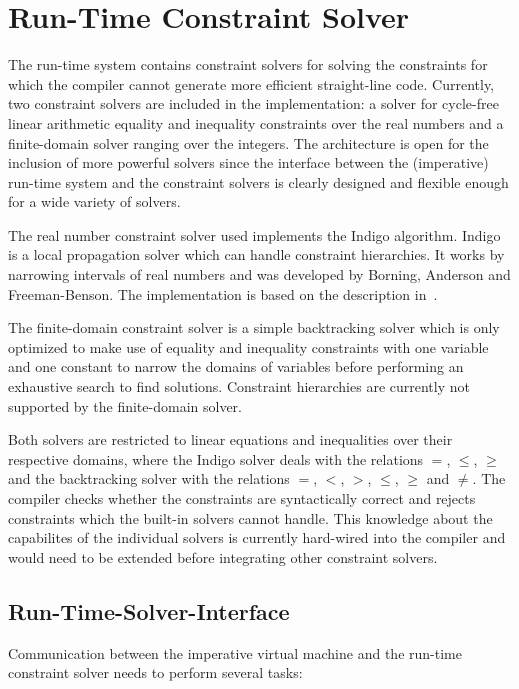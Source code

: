 \section{Run-Time Constraint Solver}

The \turtle{} run-time system contains constraint solvers for solving
the constraints for which the compiler cannot generate more efficient
straight-line code.  Currently, two constraint solvers are included in
the implementation: a solver for cycle-free linear arithmetic equality
and inequality constraints over the real numbers and a finite-domain
solver ranging over the integers.  The architecture is open for the
inclusion of more powerful solvers since the interface between the
(imperative) run-time system and the constraint solvers is clearly
designed and flexible enough for a wide variety of solvers.

The real number constraint solver used implements the Indigo
algorithm.  Indigo is a local propagation solver which can handle
constraint hierarchies.  It works by narrowing intervals of real
numbers and was developed by Borning, Anderson and Freeman-Benson.
The implementation is based on the description
in~\cite{borning96indigo}.

The finite-domain constraint solver is a simple backtracking solver
which is only optimized to make use of equality and inequality
constraints with one variable and one constant to narrow the domains
of variables before performing an exhaustive search to find solutions.
Constraint hierarchies are currently not supported by the
finite-domain solver.

Both solvers are restricted to linear equations and inequalities over
their respective domains, where the Indigo solver deals with the
relations $=$, $\le$, $\ge$ and the backtracking solver with the
relations $=$, $<$, $>$, $\le$, $\ge$ and $\not=$.  The compiler
checks whether the constraints are syntactically correct and rejects
constraints which the built-in solvers cannot handle.  This knowledge
about the capabilites of the individual solvers is currently
hard-wired into the compiler and would need to be extended before
integrating other constraint solvers.

\subsection{Run-Time-Solver-Interface}

Communication between the imperative virtual machine and the run-time
constraint solver needs to perform several tasks:


